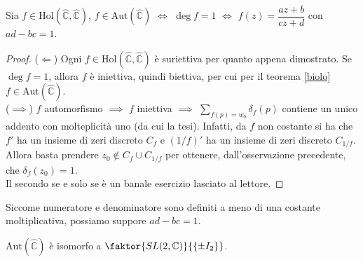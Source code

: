 \begin{cor}
  Sia $f \in \text{Hol}(\hat{\mathbb{C}}, \hat{\mathbb{C}})$, $f \in \text{Aut}(\hat{\mathbb{C}})$ $\iff$ $\deg{f}=1$ $\iff$ $f(z)=\dfrac{az+b}{cz+d}$ con $ad-bc=1$.
\end{cor}

\begin{proof}
  ($\Leftarrow$) Ogni $f \in \text{Hol}(\hat{\mathbb{C}}, \hat{\mathbb{C}})$ è suriettiva per quanto appena dimostrato. Se $\deg{f}=1$, allora $f$ è iniettiva, quindi biettiva, per cui per il teorema \ref{biolo} $f \in \text{Aut}(\hat{\mathbb{C}})$. \\
  ($\implies$) $f$ automorfismo $\implies$ $f$ iniettiva $\implies$ $\displaystyle \sum_{f(p)=w_0} \delta_f(p)$ contiene un unico addento con molteplicità uno (da cui la tesi). Infatti, da $f$ non costante si ha che $f'$ ha un insieme di zeri discreto $C_f$ e $(1/f)'$ ha un insieme di zeri discreto $C_{1/f}$. Allora basta prendere $z_0 \not\in C_f \cup C_{1/f}$ per ottenere, dall'osservazione precedente, che $\delta_f(z_0)=1$. \\
  Il secondo se e solo se è un banale esercizio lasciato al lettore.
\end{proof}

\begin{oss}
  Siccome numeratore e denominatore sono definiti a meno di una costante moltiplicativa, possiamo suppore $ad-bc=1$.
\end{oss}

\begin{exc}
  $\text{Aut}(\hat{\mathbb{C}})$ è isomorfo a $\faktor{SL(2, \mathbb{C})}{\{\pm I_2\}}$.
\end{exc}
